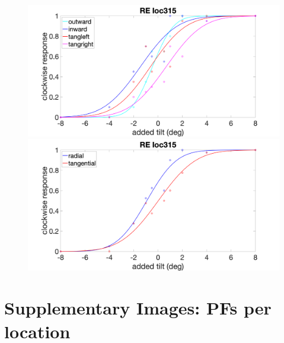 \documentclass[11pt]{article} %
\begin{document}
\begin{figure}[H]
\centering %
\includegraphics[scale=.15]{Images/RE_PF_loc315_4conds.png}
\includegraphics[scale=.15]{Images/RE_PF_loc315_2conds.png}
\end{figure}

\newpage
\section{Supplementary Images: PFs per location}
\end{document}
